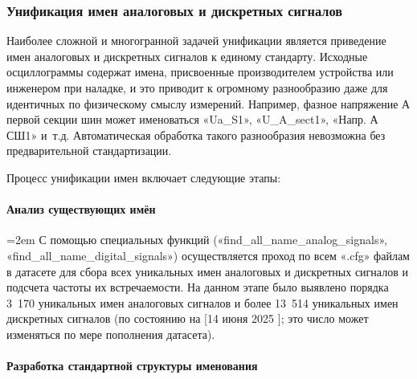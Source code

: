 

\subsubsection{Унификация имен аналоговых и дискретных сигналов}\label{sec:ch3_signal_names_unification}

Наиболее сложной и многогранной задачей унификации является приведение имен аналоговых и дискретных сигналов к единому стандарту. Исходные осциллограммы содержат имена, присвоенные производителем устройства или инженером при наладке, и это приводит к огромному разнообразию даже для идентичных по физическому смыслу измерений. Например, фазное напряжение А первой секции шин может именоваться «Ua\_S1», «U\_A\_sect1», «Напр. А СШ1» и~т.д. Автоматическая обработка такого разнообразия невозможна без предварительной стандартизации.

Процесс унификации имен включает следующие этапы:

\paragraph{Анализ существующих имён}
\mbox{}\par\vspace{0.2cm}

{\emergencystretch=2em С помощью специальных функций («\allowbreak find\_\allowbreak all\_\allowbreak name\_\allowbreak analog\_\allowbreak signals», «\allowbreak find\_\allowbreak all\_\allowbreak name\_\allowbreak digital\_\allowbreak signals») осуществляется проход по всем «.cfg» файлам в датасете для сбора всех уникальных имен аналоговых и дискретных сигналов и подсчета частоты их встречаемости. На данном этапе было выявлено порядка 3~170 уникальных имен аналоговых сигналов и более 13~514 уникальных имен дискретных сигналов (по состоянию на [14 июня 2025 ]; это число может изменяться по мере пополнения датасета).\par}

\paragraph{Разработка стандартной структуры именования}
\mbox{}\par\vspace{0.2cm}

